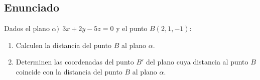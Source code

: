 \subsection{Enunciado}
\noindent Dados el plano $\alpha) \ \ 3x + 2y - 5z = 0$ y el punto $B(2, 1, -1)$:

\begin{enumerate}
	\item Calculen la distancia del punto $B$ al plano $\alpha$.
	\item Determinen las coordenadas del punto $B'$ del plano cuya distancia al punto $B$ coincide con la distancia del punto $B$ al plano $\alpha$.
\end{enumerate}
